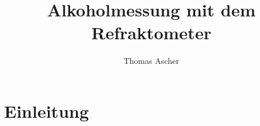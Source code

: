 \documentclass[a4paper,parskip=half]{scrartcl}
\title{Alkoholmessung mit dem Refraktometer}
\author{Thomas Ascher}
\begin{document}
\maketitle

\section*{Einleitung}

\autocite{Terrill2013}
\autocite{Novotny2017}
\autocite{Novotny2017a}
\autocite{Bonham2001}
\autocite{Gossett2012}
\autocite{Gossett2012a}
\autocite{Gossett2012b}
\autocite{Gossett2012c}
\autocite{Troester2012}
\autocite{Terrill2010}
\autocite{Terrill2010a}
\autocite{Terrill2011}
\autocite{Siebel1938}
\autocite{Weiss2016}




\printbibliography[title=Quellen]
\end{document}

